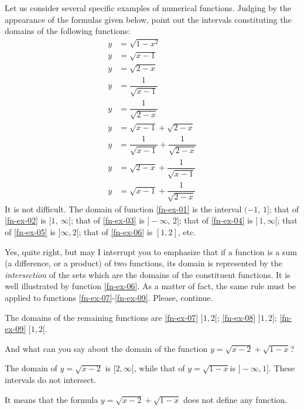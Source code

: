 {Let us consider several specific examples of numerical functions. Judging by the appearance of the formulas given below, point out the intervals constituting the domains of the following functions:
\begin{align}%
y & = \sqrt{ 1 - x^{2}}	\label{fn-ex-01}\\
y & = \sqrt{ x - 1}		\label{fn-ex-02}\\
y & = \sqrt{2 - x} 	\label{fn-ex-03}\\
y & = \dfrac{1}{\sqrt{x-1}}	\label{fn-ex-04}\\	
y & = \dfrac{1}{\sqrt{2-x}}		\label{fn-ex-05}\\
y & = 	\sqrt{x-1} + \sqrt{2-x}\label{fn-ex-06}\\
y & = \dfrac{1}{\sqrt{x-1}}	+ \dfrac{1}{\sqrt{2 -x }}		\label{fn-ex-07}\\
y & =	\sqrt{2 -x } +  \dfrac{1}{\sqrt{x-1}}	 	\label{fn-ex-08}\\
y & = \sqrt{x-1} +	\dfrac{1}{\sqrt{2 -x }} \label{fn-ex-09}
\end{align}
\rdr It is not difficult. The domain of function \eqref{fn-ex-01} is the interval $(-1, \, 1]$; that of \eqref{fn-ex-02} is $[1, \, \infty[$; that of \eqref{fn-ex-03} is $]-\infty, \, 2]$; that of \eqref{fn-ex-04} is $]\, 1, \infty[$; that of \eqref{fn-ex-05} is $]\infty, 2[$; that of \eqref{fn-ex-06} is $[1, 2]$, etc.

\athr Yes, quite right, but may I interrupt you to emphasize that if a function is a sum (a difference, or a product) of two functions, its domain is represented by the \emph{intersection} of the sets which are the domains of the constituent functions. It is well illustrated by function \eqref{fn-ex-06}. As a matter of fact, the same rule must be applied to functions \eqref{fn-ex-07}-\eqref{fn-ex-09}. Please, continue.

\rdr The domains of the remaining functions are \eqref{fn-ex-07} $]1, 2[$; \eqref{fn-ex-08} $]1,2]$; \eqref{fn-ex-09} $[1, 2[$.

\athr And what can you say about the domain of the function $y= \sqrt{x -2 } + \sqrt{1 -x }$?

\rdr The domain of  $y= \sqrt{x -2 }$ is $[2, \infty[$, while that of  $y= \sqrt{1 -x }$is $]- \infty, 1]$. These intervals do not intersect.

\athr It means	that the formula  $y= \sqrt{x -2 } + \sqrt{1 -x }$ does not define any function.
}